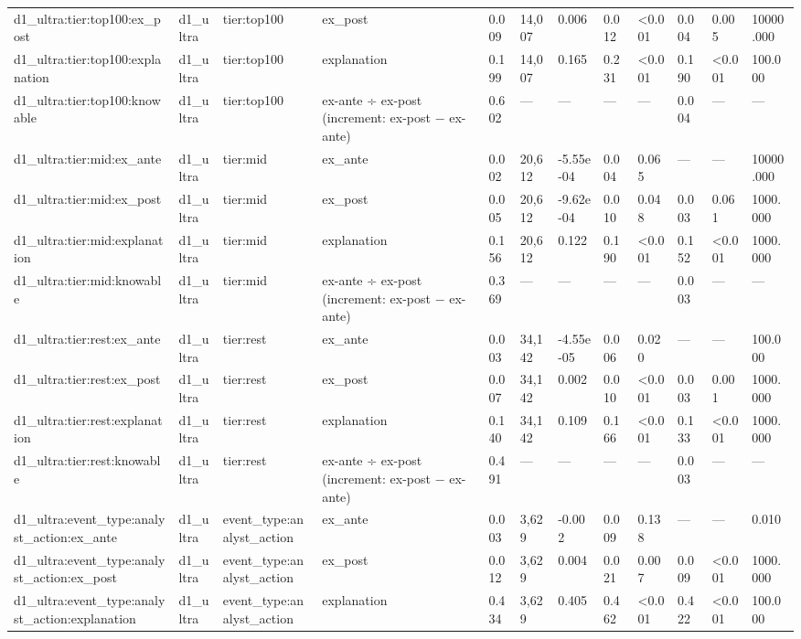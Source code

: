 \begin{tabular}{llllllllllll}
d1\_ultra:tier:top100:ex\_post & d1\_ultra & tier:top100 & ex\_post & 0.009 & 14,007 & 0.006 & 0.012 & <0.001 & 0.004 & 0.005 & 10000.000 \\
d1\_ultra:tier:top100:explanation & d1\_ultra & tier:top100 & explanation & 0.199 & 14,007 & 0.165 & 0.231 & <0.001 & 0.190 & <0.001 & 100.000 \\
d1\_ultra:tier:top100:knowable & d1\_ultra & tier:top100 & ex-ante ÷ ex-post (increment: ex-post − ex-ante) & 0.602 & — & — & — & — & 0.004 & — & — \\
d1\_ultra:tier:mid:ex\_ante & d1\_ultra & tier:mid & ex\_ante & 0.002 & 20,612 & -5.55e-04 & 0.004 & 0.065 & — & — & 10000.000 \\
d1\_ultra:tier:mid:ex\_post & d1\_ultra & tier:mid & ex\_post & 0.005 & 20,612 & -9.62e-04 & 0.010 & 0.048 & 0.003 & 0.061 & 1000.000 \\
d1\_ultra:tier:mid:explanation & d1\_ultra & tier:mid & explanation & 0.156 & 20,612 & 0.122 & 0.190 & <0.001 & 0.152 & <0.001 & 1000.000 \\
d1\_ultra:tier:mid:knowable & d1\_ultra & tier:mid & ex-ante ÷ ex-post (increment: ex-post − ex-ante) & 0.369 & — & — & — & — & 0.003 & — & — \\
d1\_ultra:tier:rest:ex\_ante & d1\_ultra & tier:rest & ex\_ante & 0.003 & 34,142 & -4.55e-05 & 0.006 & 0.020 & — & — & 100.000 \\
d1\_ultra:tier:rest:ex\_post & d1\_ultra & tier:rest & ex\_post & 0.007 & 34,142 & 0.002 & 0.010 & <0.001 & 0.003 & 0.001 & 1000.000 \\
d1\_ultra:tier:rest:explanation & d1\_ultra & tier:rest & explanation & 0.140 & 34,142 & 0.109 & 0.166 & <0.001 & 0.133 & <0.001 & 1000.000 \\
d1\_ultra:tier:rest:knowable & d1\_ultra & tier:rest & ex-ante ÷ ex-post (increment: ex-post − ex-ante) & 0.491 & — & — & — & — & 0.003 & — & — \\
d1\_ultra:event\_type:analyst\_action:ex\_ante & d1\_ultra & event\_type:analyst\_action & ex\_ante & 0.003 & 3,629 & -0.002 & 0.009 & 0.138 & — & — & 0.010 \\
d1\_ultra:event\_type:analyst\_action:ex\_post & d1\_ultra & event\_type:analyst\_action & ex\_post & 0.012 & 3,629 & 0.004 & 0.021 & 0.007 & 0.009 & <0.001 & 1000.000 \\
d1\_ultra:event\_type:analyst\_action:explanation & d1\_ultra & event\_type:analyst\_action & explanation & 0.434 & 3,629 & 0.405 & 0.462 & <0.001 & 0.422 & <0.001 & 100.000 \\

\end{tabular}
